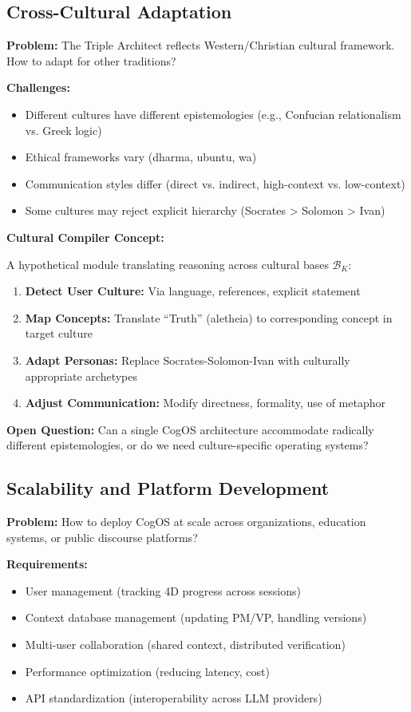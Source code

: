 \documentclass[11pt,a4paper]{article}
\theoremstyle{definition}
\theoremstyle{remark}
\begin{document}
\subsection{Cross-Cultural Adaptation}

\textbf{Problem:} The Triple Architect reflects Western/Christian cultural framework. How to adapt for other traditions?

\textbf{Challenges:}
\begin{itemize}
    \item Different cultures have different epistemologies (e.g., Confucian relationalism vs. Greek logic)
    \item Ethical frameworks vary (dharma, ubuntu, wa)
    \item Communication styles differ (direct vs. indirect, high-context vs. low-context)
    \item Some cultures may reject explicit hierarchy (Socrates > Solomon > Ivan)
\end{itemize}

\textbf{Cultural Compiler Concept:}

A hypothetical module translating reasoning across cultural bases $\mathcal{B}_K$:

\begin{enumerate}
    \item \textbf{Detect User Culture:} Via language, references, explicit statement
    \item \textbf{Map Concepts:} Translate ``Truth'' (aletheia) to corresponding concept in target culture
    \item \textbf{Adapt Personas:} Replace Socrates-Solomon-Ivan with culturally appropriate archetypes
    \item \textbf{Adjust Communication:} Modify directness, formality, use of metaphor
\end{enumerate}

\textbf{Open Question:} Can a single CogOS architecture accommodate radically different epistemologies, or do we need culture-specific operating systems?

\subsection{Scalability and Platform Development}

\textbf{Problem:} How to deploy CogOS at scale across organizations, education systems, or public discourse platforms?

\textbf{Requirements:}
\begin{itemize}
    \item User management (tracking 4D progress across sessions)
    \item Context database management (updating PM/VP, handling versions)
    \item Multi-user collaboration (shared context, distributed verification)
    \item Performance optimization (reducing latency, cost)
    \item API standardization (interoperability across LLM providers)
\end{itemize}
\end{document}
